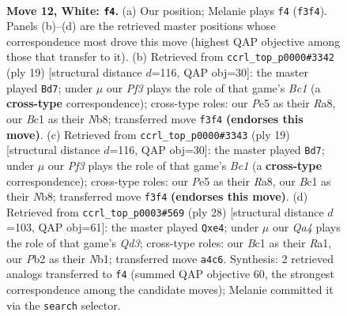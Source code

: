 \documentclass[11pt]{article}
\begin{document}
\begin{figure}[p]
\label{fig:thought-m20}
\end{figure}

\clearpage

\begin{figure}[p]\centering
\begin{subfigure}{0.46\textwidth}\centering
\resizebox{\linewidth}{!}{%
\newchessgame
\chessboard[
  setfen={r1bqk3/pp1n1pp1/2n1p3/3pP3/Qb1P3r/5P2/PP1N2PP/R1B1K1NR w KQq - 5 12},
  showmover=false,
  pgfstyle=straightmove, color=movearrow, markmove={f3-f4}
]}
\caption{}
\end{subfigure}\hfill
\begin{subfigure}{0.46\textwidth}\centering
\resizebox{\linewidth}{!}{%
\newchessgame
\chessboard[
  setfen={rnb1k1nr/pp4pp/5q2/1B1p2N1/1b1Pp3/2N5/PP3PPP/R1BQK2R b KQkq - 1 10},
  showmover=false,
  pgfstyle=straightmove, color=movearrow, markmove={c8-d7}
]}
\caption{}
\end{subfigure}
\\[4pt]
\begin{subfigure}{0.46\textwidth}\centering
\resizebox{\linewidth}{!}{%
\newchessgame
\chessboard[
  setfen={rnb1k1nr/pp4pp/5q2/1B1p2N1/1b1Pp3/2N5/PP3PPP/R1BQK2R b KQkq - 1 10},
  showmover=false,
  pgfstyle=straightmove, color=movearrow, markmove={c8-d7}
]}
\caption{}
\end{subfigure}\hfill
\begin{subfigure}{0.46\textwidth}\centering
\resizebox{\linewidth}{!}{%
\newchessgame
\chessboard[
  setfen={1r1qk2r/p4p2/2pb2p1/n3p3/4n1p1/3Q4/PPPP1PPP/RNB1K2R w KQk - 0 15},
  showmover=false,
  pgfstyle=straightmove, color=movearrow, markmove={d3-e4}
]}
\caption{}
\end{subfigure}
\caption{\textbf{Move 12, White: \texttt{f4}.} (a) Our position; Melanie plays \texttt{f4} (\texttt{f3f4}). Panels (b)--(d) are the retrieved master positions whose correspondence most drove this move (highest QAP objective among those that transfer to it). (b) Retrieved from \texttt{ccrl\_top\_p0000\#3342} (ply 19) [structural distance $d$=116, QAP obj=30]: the master played \texttt{Bd7}; under $\mu$ our \emph{Pf3} plays the role of that game's \emph{Bc1} (a \textbf{cross-type} correspondence); cross-type roles: our \emph{P}e5 as their \emph{R}a8, our \emph{B}c1 as their \emph{N}b8; transferred move \texttt{f3f4} \textbf{(endorses this move)}. (c) Retrieved from \texttt{ccrl\_top\_p0000\#3343} (ply 19) [structural distance $d$=116, QAP obj=30]: the master played \texttt{Bd7}; under $\mu$ our \emph{Pf3} plays the role of that game's \emph{Bc1} (a \textbf{cross-type} correspondence); cross-type roles: our \emph{P}e5 as their \emph{R}a8, our \emph{B}c1 as their \emph{N}b8; transferred move \texttt{f3f4} \textbf{(endorses this move)}. (d) Retrieved from \texttt{ccrl\_top\_p0003\#569} (ply 28) [structural distance $d$=103, QAP obj=61]: the master played \texttt{Qxe4}; under $\mu$ our \emph{Qa4} plays the role of that game's \emph{Qd3}; cross-type roles: our \emph{B}c1 as their \emph{R}a1, our \emph{P}b2 as their \emph{N}b1; transferred move \texttt{a4c6}. Synthesis: 2 retrieved analogs transferred to \texttt{f4} (summed QAP objective 60, the strongest correspondence among the candidate moves); Melanie committed it via the \texttt{search} selector.}

\end{figure}
\end{document}
